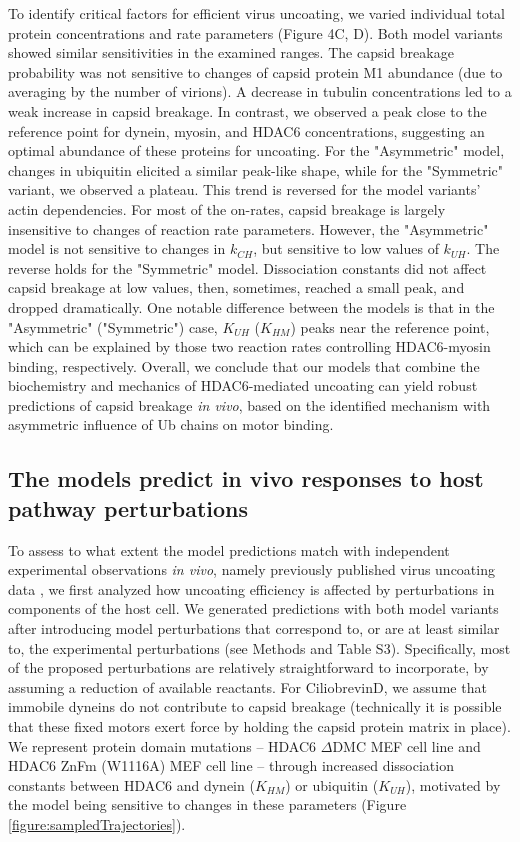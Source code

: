 To identify critical factors for efficient virus uncoating, we varied individual total protein concentrations and rate parameters (Figure 4C, D). Both model variants showed similar sensitivities in the examined ranges. The capsid breakage probability was not sensitive to changes of capsid protein M1 abundance (due to averaging by the number of virions). A decrease in tubulin concentrations led to a weak increase in capsid breakage. In contrast, we observed a peak close to the reference point for dynein, myosin, and HDAC6 concentrations, suggesting an optimal abundance of these proteins for uncoating. For the "Asymmetric" model, changes in ubiquitin elicited a similar peak-like shape, while for the "Symmetric" variant, we observed a plateau. This trend is reversed for the model variants’ actin dependencies. For most of the on-rates, capsid breakage is largely insensitive to changes of reaction rate parameters. However, the "Asymmetric" model is not sensitive to changes in  $k_{CH}$, but sensitive to low values of $k_{UH}$. The reverse holds for the "Symmetric" model. Dissociation constants did not affect capsid breakage at low values, then, sometimes, reached a small peak, and dropped dramatically. One notable difference between the models is that in the "Asymmetric" ("Symmetric") case, $K_{UH}$ ($K_{HM}$) peaks near the reference point, which can be explained by those two reaction rates controlling HDAC6-myosin binding, respectively. Overall, we conclude that our models that combine the biochemistry and mechanics of HDAC6-mediated uncoating can yield robust predictions of capsid breakage \textit{in vivo}, based on the identified mechanism with asymmetric influence of Ub chains on motor binding.

\subsection{The models predict in vivo responses to host pathway perturbations}

To assess to what extent the model predictions match with independent experimental observations \textit{in vivo}, namely previously published virus uncoating data \cite{banerjee2014influenza}, we first analyzed how uncoating efficiency is affected by perturbations in components of the host cell. We generated predictions with both model variants after introducing model perturbations that correspond to, or are at least similar to, the experimental perturbations (see Methods and Table S3). Specifically, most of the proposed perturbations are relatively straightforward to incorporate, by assuming a reduction of available reactants. For CiliobrevinD, we assume that immobile dyneins do not contribute to capsid breakage (technically it is possible that these fixed motors exert force by holding the capsid protein matrix in place). We represent protein domain mutations – HDAC6 $\Delta$DMC MEF cell line and HDAC6 ZnFm (W1116A) MEF cell line – through increased dissociation constants between HDAC6 and dynein ($K_{HM}$) or ubiquitin ($K_{UH}$), motivated by the model being sensitive to changes in these parameters (Figure \ref{figure:sampledTrajectories}).

